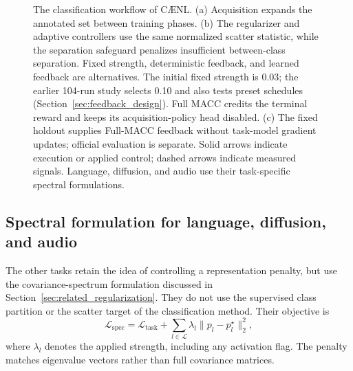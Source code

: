 \documentclass[10pt,a4paper,twocolumn]{article}
\newcommand{\model}{C\AE{}NL}
\begin{document}
\begin{figure}[tbp]
\caption{The classification workflow of \model{}. (a) Acquisition expands the
annotated set between training phases. (b) The regularizer and adaptive
controllers use the same normalized scatter statistic, while the separation
safeguard penalizes insufficient between-class separation. Fixed strength,
deterministic feedback, and learned feedback are alternatives. The initial
fixed strength is 0.03; the earlier 104-run study selects 0.10 and also tests
preset schedules (Section~\ref{sec:feedback_design}). Full MACC credits the
terminal reward and keeps its acquisition-policy head disabled.
(c) The fixed holdout supplies Full-MACC feedback without task-model gradient
updates; official evaluation is separate. Solid arrows indicate execution or
applied control; dashed arrows indicate measured signals. Language, diffusion,
and audio use their task-specific spectral formulations.}
\label{fig:detailed_workflow}\label{fig:framework_overview}
\end{figure}


\subsection{Spectral formulation for language, diffusion, and audio}
\label{sec:spectral}

The other tasks retain the idea of controlling a representation penalty,
but use the covariance-spectrum formulation discussed in
Section~\ref{sec:related_regularization}. They do not use the supervised
class partition or the scatter target of the classification method.
Their objective is
\begin{equation}
 \mathcal L_{\mathrm{spec}}=
 \mathcal L_{\mathrm{task}}+
 \sum_{l\in\mathcal L}\lambda_l\|p_l-p_l^\star\|_2^2,
 \label{eq:spectral}
\end{equation}
where $\lambda_l$ denotes the applied strength, including any activation
flag. The penalty matches eigenvalue vectors rather than full covariance
matrices.
\end{document}
